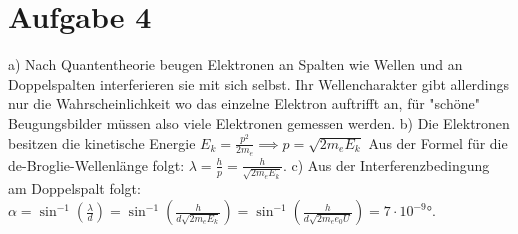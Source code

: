 \section{Aufgabe 4}
\label{sec:a4}
a) \newline
Nach Quantentheorie beugen Elektronen an Spalten wie Wellen und an Doppelspalten interferieren sie mit sich selbst. Ihr Wellencharakter gibt allerdings nur die Wahrscheinlichkeit wo das einzelne Elektron auftrifft an, für "schöne" Beugungsbilder müssen also viele Elektronen gemessen werden.
\newline
\newline
b)\newline
Die Elektronen besitzen die kinetische Energie $E_k = \frac{p^2}{2m_e} \implies p=\sqrt{2m_e E_k}$ Aus der Formel für die de-Broglie-Wellenlänge folgt: $\lambda = \frac{h}{p} = \frac{h}{\sqrt{2m_e E_k}}.$\newline
\newline
c) \newline
Aus der Interferenzbedingung am Doppelspalt folgt: $\alpha = \sin^{-1}\left(\frac{\lambda}{d}\right)= \sin^{-1}\left(\frac{h}{d \sqrt{2m_e E_k}}\right) = \sin^{-1}\left(\frac{h}{d \sqrt{2m_e e_0 U}}\right) = 7 \cdot 10^{-9}°$.
